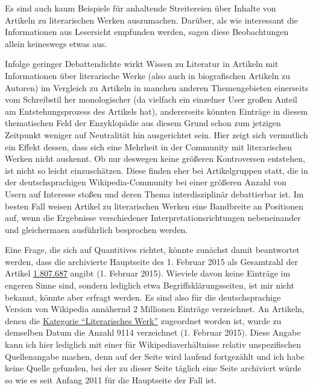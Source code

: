 \documentclass[fontsize=12pt]{scrartcl}
\begin{document}
Es sind auch kaum Beispiele f\"ur anhaltende Streitereien \"uber Inhalte von Artikeln zu li\-te\-ra\-rischen Werken auszumachen. Dar\"uber, als wie interessant die Informationen aus Leser\textsuperscript{\tiny *}sicht empfunden werden, sagen diese Beobachtungen allein keineswegs etwas aus. 

Infolge geringer Debattendichte wirkt Wissen zu Li\-te\-ra\-tur in Artikeln mit Informationen \"uber li\-te\-ra\-rische Werke (also auch in bio\-gra\-fi\-schen Artikeln zu Autoren\textsuperscript{\tiny *}) im Vergleich zu Artikeln in manchen anderen Themengebieten einerseits vom Schreibstil her monologischer (da vielfach ein einzelner \mbox{User} gro{\ss}en Anteil am Entstehungsprozess des Artikels hat), an\-de\-rerseits k\"onnten Eintr\"age in diesem thematischen Feld der Enzyklop\"adie aus diesem Grund schon zum jetzigen Zeitpunkt weniger auf Neutralit\"at hin ausgerichtet sein. \mbox{Hier} zeigt sich vermutlich ein Effekt dessen, dass sich eine Mehrheit in der Community mit li\-te\-ra\-rischen Werken nicht auskennt. Ob nur deswegen keine gr\"o{\ss}eren Kontroversen entstehen, ist nicht so leicht einzusch\"atzen. Diese finden eher bei Artikelgruppen statt, die in der deutschspra\-chi\-gen Wi\-ki\-pe\-dia-Community bei einer gr\"o{\ss}eren Anzahl von Usern auf Interesse sto{\ss}en und deren Thema interdisziplin\"ar debattierbar ist. Im besten Fall weisen Artikel zu li\-te\-ra\-rischen Werken eine Bandbreite an Positionen auf, wenn die Ergebnisse verschiedener Interpretationsrichtungen nebeneinander und glei\-cherma\-{\ss}en ausf\"uhrlich besprochen werden.

Eine Frage, die sich auf Quantitives richtet, k\"onnte zun\"achst damit beantwortet werden, dass die archivierte Hauptseite des 1. Februar 2015 als Gesamtzahl der Artikel \href{https://de.wikipedia.org/wiki/Wikipedia:Hauptseite/Archiv/1._Februar_2015}{1.807.687} angibt (1. Februar 2015). Wieviele davon keine Eintr\"age im engeren Sinne sind, sondern lediglich etwa Begriffskl\"arungssei\-ten, ist mir nicht bekannt, k\"onnte aber erfragt werden. Es sind also f\"ur die deutschspra\-chi\-ge Version von Wi\-ki\-pe\-dia ann\"ahernd 2 Millionen Eintr\"age verzeichnet. An Artikeln, denen die \href{https://de.wikipedia.org/wiki/Kategorie:Literarisches_Werk}{Kategorie "`Li\-te\-ra\-risches Werk"'} zugeordnet worden ist, wurde zu demselben Datum die Anzahl 9114 verzeichnet (1. Februar 2015). Diese Angabe kann ich \mbox{hier} lediglich mit einer f\"ur Wi\-ki\-pe\-dia\-verh\"altnisse relativ unspezifischen Quellenangabe machen, denn auf der Seite wird laufend fortgez\"ahlt und ich habe keine Quelle gefunden, bei der zu dieser Seite t\"aglich eine Seite archi\-viert w\"urde so wie es seit Anfang 2011 f\"ur die Hauptseite der Fall ist. 
\end{document}
